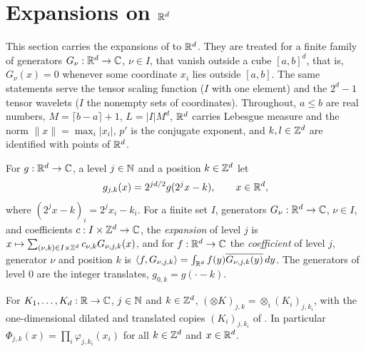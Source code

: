 \section{Expansions on \texorpdfstring{$\mathbb{R}^d$}{R\^{}d}}
\label{sec:daub-rd-expansions}

This section carries the expansions of  to $\mathbb{R}^d$. They are treated for a
finite family of generators $G_\nu : \mathbb{R}^d \to \mathbb{C}$, $\nu \in I$, that vanish outside a cube
$[a, b]^d$, that is, $G_\nu(x) = 0$ whenever some coordinate $x_i$ lies outside $[a, b]$. The
same statements serve the tensor scaling function ($I$ with one element) and the $2^d - 1$
tensor wavelets ($I$ the nonempty sets of coordinates). Throughout, $a \leq b$ are real
numbers, $M = \lceil b - a \rceil + 1$, $L = |I| M^d$, $\mathbb{R}^d$ carries Lebesgue measure and the
norm $\|x\| = \max_i |x_i|$, $p'$ is the conjugate exponent, and $k, l \in \mathbb{Z}^d$ are identified
with points of $\mathbb{R}^d$.

\begin{definition}
\label{def:daub-rd-expansions}
\leanok
{}
For $g : \mathbb{R}^d \to \mathbb{C}$, a level $j \in \mathbb{N}$ and a position $k \in \mathbb{Z}^d$ let
\[
  g_{j,k}(x) = 2^{jd/2} g(2^j x - k) , \qquad x \in \mathbb{R}^d ,
\]
where $(2^j x - k)_i = 2^j x_i - k_i$. For a finite set $I$, generators $G_\nu : \mathbb{R}^d \to \mathbb{C}$,
$\nu \in I$, and coefficients $c : I \times \mathbb{Z}^d \to \mathbb{C}$, the \emph{expansion} of level $j$ is
$x \mapsto \sum_{(\nu, k) \in I \times \mathbb{Z}^d} c_{\nu,k} G_{\nu,j,k}(x)$, and for $f : \mathbb{R}^d \to \mathbb{C}$
the \emph{coefficient} of level $j$, generator $\nu$ and position $k$ is
$\langle f, G_{\nu,j,k} \rangle = \int_{\mathbb{R}^d} f(y) \overline{G_{\nu,j,k}(y)} \, dy$. The generators
of level $0$ are the integer translates, $g_{0,k} = g(\cdot - k)$.
\end{definition}

\begin{lemma}
\label{lem:daub-rd-scaled-tensor}
\leanok
{}
For $K_1, \dots, K_d : \mathbb{R} \to \mathbb{C}$, $j \in \mathbb{N}$ and $k \in \mathbb{Z}^d$,
$(\otimes K)_{j,k} = \otimes_i (K_i)_{j,k_i}$, with the one-dimensional dilated and translated
copies $(K_i)_{j,k_i}$ of . In particular
$\Phi_{j,k}(x) = \prod_i \varphi_{j,k_i}(x_i)$ for all $k \in \mathbb{Z}^d$ and $x \in \mathbb{R}^d$.
\end{lemma}

